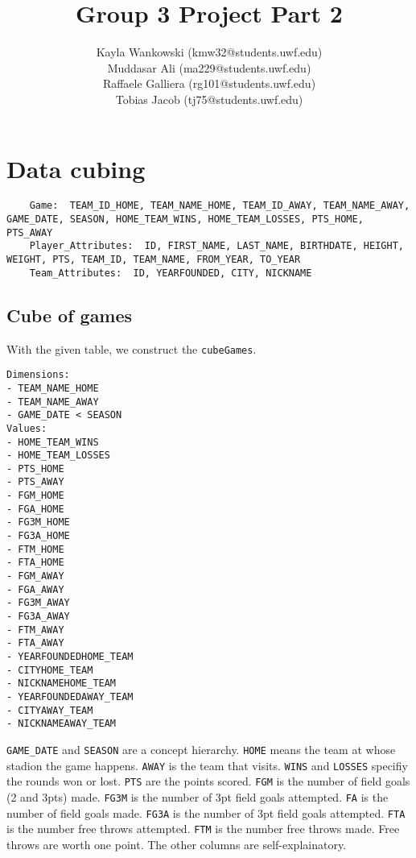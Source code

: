 \documentclass{article}
\begin{document}
\title{Group 3 Project Part 2}
\author{
    Kayla Wankowski (kmw32@students.uwf.edu)\\
    Muddasar Ali (ma229@students.uwf.edu)\\
    Raffaele Galliera (rg101@students.uwf.edu)\\
    Tobias Jacob (tj75@students.uwf.edu)
}

\maketitle

\section{Data cubing}

\begin{lstlisting}
    Game:  TEAM_ID_HOME, TEAM_NAME_HOME, TEAM_ID_AWAY, TEAM_NAME_AWAY, GAME_DATE, SEASON, HOME_TEAM_WINS, HOME_TEAM_LOSSES, PTS_HOME, PTS_AWAY 
    Player_Attributes:  ID, FIRST_NAME, LAST_NAME, BIRTHDATE, HEIGHT, WEIGHT, PTS, TEAM_ID, TEAM_NAME, FROM_YEAR, TO_YEAR 
    Team_Attributes:  ID, YEARFOUNDED, CITY, NICKNAME 
\end{lstlisting}

\subsection{Cube of games}
With the given table, we construct the \texttt{cubeGames}.
\begin{lstlisting}
Dimensions:
- TEAM_NAME_HOME
- TEAM_NAME_AWAY
- GAME_DATE < SEASON
Values:
- HOME_TEAM_WINS
- HOME_TEAM_LOSSES
- PTS_HOME
- PTS_AWAY
- FGM_HOME
- FGA_HOME
- FG3M_HOME
- FG3A_HOME
- FTM_HOME
- FTA_HOME
- FGM_AWAY
- FGA_AWAY
- FG3M_AWAY
- FG3A_AWAY
- FTM_AWAY
- FTA_AWAY
- YEARFOUNDEDHOME_TEAM
- CITYHOME_TEAM
- NICKNAMEHOME_TEAM
- YEARFOUNDEDAWAY_TEAM
- CITYAWAY_TEAM
- NICKNAMEAWAY_TEAM
\end{lstlisting}
\texttt{GAME\_DATE} and \texttt{SEASON} are a concept hierarchy.
\texttt{HOME} means the team at whose stadion the game happens.
\texttt{AWAY} is the team that visits.
\texttt{WINS} and \texttt{LOSSES} specifiy the rounds won or lost.
\texttt{PTS} are the points scored.
\texttt{FGM} is the number of field goals (2 and 3pts) made.
\texttt{FG3M} is the number of 3pt field goals attempted.
\texttt{FA} is the number of field goals made.
\texttt{FG3A} is the number of 3pt field goals attempted.
\texttt{FTA} is the number free throws attempted.
\texttt{FTM} is the number free throws made. Free throws are worth one point.
The other columns are self-explainatory.
\end{document}

